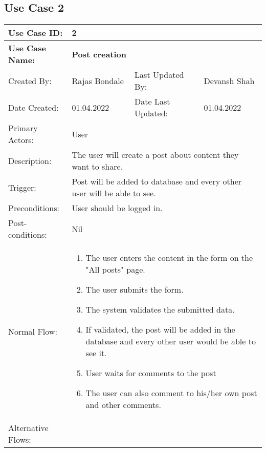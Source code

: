 \documentclass[12pt]{article}
\begin{document}
\subsection{Use Case 2}
\begin{center}
    \begin{longtable}{ | p{3cm} | p{3cm} | p{3cm} | p{3cm} | }
        \hline
        \textbf{Use Case ID:} & \multicolumn{3}{l|}{\textbf{2}} \\
        \hline
        \textbf{Use Case Name:} & \multicolumn{3}{l|}{\textbf{Post creation}}\\
        \hline
         Created By: & Rajas Bondale & Last Updated By: & Devansh Shah \\
        \hline
        Date Created: & 01.04.2022 & Date Last Updated: & 01.04.2022 \\
        \hline
        Primary Actors: & \multicolumn{3}{l|}{User}\\
        \hline
        Description: & \multicolumn{3}{p{9cm}|}{The user will create a post about content they want to share.}\\
        \hline
        Trigger: & \multicolumn{3}{p{9cm}|}{Post will be added to database and every other user will be able to see.}\\
        \hline
        Preconditions: & \multicolumn{3}{p{9cm}|}{User should be logged in.}\\
        \hline
        Post-conditions: & \multicolumn{3}{p{9cm}|}{Nil}\\
        \hline
        Normal Flow: & \multicolumn{3}{p{9cm}|}{
            \begin{enumerate}
                \item The user enters the content in the form on the "All posts" page.
                \item The user submits the form.
                \item The system validates the submitted data.
                \item If validated, the post will be added in the database and every other user would be able to see it.
                \item User waits for comments to the post
                \item The user can also comment to his/her own post and other comments.
            \end{enumerate}
        }\\
        \hline
        Alternative Flows: & \multicolumn{3}{p{9cm}|}{
            \begin{enumerate}

\end{enumerate}}
\end{longtable}
\end{center}
\end{document}
